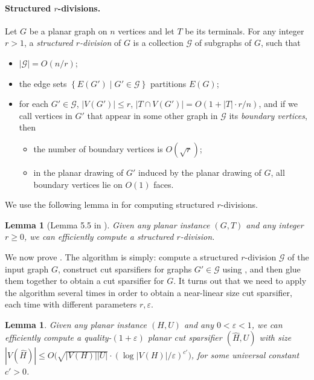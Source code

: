 \documentclass[11pt]{article}
\newtheorem{lemma}[theorem]{Lemma}
\theoremstyle{definition}
\newcommand{\set}[1]{\left\{ #1 \right\}}
\newcommand{\gset}{{\mathcal{G}}}
\newcommand{\eps}{{\varepsilon}}
\begin{document}
\paragraph{Structured $r$-divisions.} Let $G$ be a planar graph on $n$ vertices and let $T$ be its terminals. For any integer $r>1$, a \emph{structured $r$-division} of $G$ is a collection $\gset$ of subgraphs of $G$, such that
\begin{itemize}
\item $|\gset|=O(n/r)$;
\item the edge sets $\set{E(G')\mid G'\in \gset}$ partitions $E(G)$;
\item for each $G'\in \gset$, $|V(G')|\le r$, $|T\cap V(G')|=O(1+|T|\cdot r/n)$, and if we call vertices in $G'$ that appear in some other graph in $\gset$ its \emph{boundary vertices}, then
\begin{itemize}
\item the number of boundary vertices is $O(\sqrt{r})$;
\item in the planar drawing of $G'$ induced by the planar drawing of $G$, all boundary vertices lie on $O(1)$ faces.
\end{itemize}
\end{itemize}

We use the following lemma in \cite{chang2022near} for computing structured $r$-divisions.

\begin{lemma}[Lemma 5.5 in \cite{chang2022near}]
\label{lem: r-division}
Given any planar instance $(G,T)$ and any integer $r\ge 0$, we can efficiently compute a structured $r$-division.
\end{lemma}

We now prove . The algorithm is simply: compute a structured $r$-division $\gset$ of the input graph $G$, construct cut sparsifiers for graphs $G'\in \gset$ using , and then glue them together to obtain a cut sparsifier for $G$.
It turns out that we need to apply the algorithm several times in order to obtain a near-linear size cut sparsifier, each time with different parameters $r,\eps$.

\begin{lemma}
\label{lem: recursive}
Given any planar instance $(H,U)$ and any $0<\eps<1$, we can efficiently compute a quality-$(1+\eps)$ planar cut sparsifier $(\hat H, U)$ with size $|V(\hat H)|\le O\big(\sqrt{|V(H)| |U|}\cdot (\log |V(H)|/\eps)^{c'}\big)$, for some universal constant $c'>0$.
\end{lemma}
\end{document}

